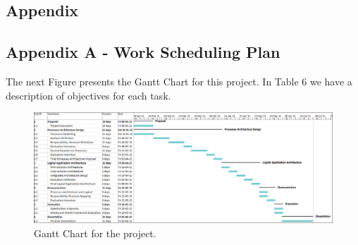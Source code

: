 
\begin{landscape}

\section{Appendix} %
\label{sec:attachments}


\subsection{Appendix A - Work Scheduling Plan} 

The next Figure presents the Gantt Chart for this project. In Table 6 we have a description of objectives for each task.



\begin{figure}[h!]
\centering
\includegraphics[height=0.55\textheight]{img/GanttChart2.png}
\caption{Gantt Chart for the project.}
\end{figure}

\end{landscape}

\newpage



